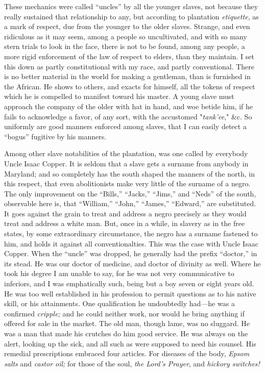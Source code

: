 These mechanics were called ``uncles'' by all the younger slaves, not
because they really sustained that relationship to any, but according to
plantation \emph{etiquette}, as a mark of respect, due from the younger
to the older slaves. Strange, and even ridiculous as it may seem, among
a people so uncultivated, and with so many stern trials to look in the
face, there is not to be found, among any people, a more rigid
enforcement of the law of respect to elders, than they maintain. I set
this down as partly constitutional with my race, and partly
conventional. There is no better {}material in the world for making a
gentleman, than is furnished in the African. He shows to others, and
exacts for himself, all the tokens of respect which he is compelled to
manifest toward his master. A young slave must approach the company of
the older with hat in hand, and woe betide him, if he fails to
acknowledge a favor, of any sort, with the accustomed "\emph{tank'ee},"
\&c. So uniformly are good manners enforced among slaves, that I can
easily detect a ``bogus'' fugitive by his manners.

Among other slave notabilities of the plantation, was one called by
everybody Uncle Isaac Copper. It is seldom that a slave gets a surname
from anybody in Maryland; and so completely has the south shaped the
manners of the north, in this respect, that even abolitionists make very
little of the surname of a negro. The only improvement on the ``Bills,''
``Jacks,'' ``Jims,'' and ``Neds'' of the south, observable here is, that
``William,'' ``John,'' ``James,'' ``Edward,'' are substituted. It goes
against the grain to treat and address a negro precisely as they would
treat and address a white man. But, once in a while, in slavery as in
the free states, by some extraordinary circumstance, the negro has a
surname fastened to him, and holds it against all conventionalties. This
was the case with Uncle Isaac Copper. When the ``uncle'' was dropped, he
generally had the prefix ``doctor,'' in its stead. He was our doctor of
medicine, and doctor of divinity as well. Where he took his degree I am
unable to say, for he was not very communicative to inferiors, and I was
emphatically such, being but a boy seven or eight years old. He {}was
too well established in his profession to permit questions as to his
native skill, or his attainments. One qualification he undoubtedly
had---he was a confirmed \emph{cripple;} and he could neither work, nor
would he bring anything if offered for sale in the market. The old man,
though lame, was no sluggard. He was a man that made his crutches do him
good service. He was always on the alert, looking up the sick, and all
such as were supposed to need his counsel. His remedial prescriptions
embraced four articles. For diseases of the body, \emph{Epsom salts} and
\emph{castor oil;} for those of the soul, \emph{the Lord's Prayer}, and
\emph{hickory switches!}


